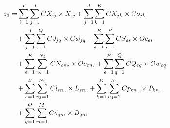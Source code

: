 \documentclass[preprint,12pt,authoryear]{elsarticle}
\begin{document}
\begin{align}
  z_3 &= \sum_{i=1}^I\sum_{j=1}^J CX_{ij} \times X_{ij} 
      + \sum_{j=1}^J\sum_{k=1}^K CK_{jk} \times Go_{jk} \notag \\
      &\quad + \sum_{j=1}^J\sum_{q=1}^Q CJ_{jq} \times Gw_{jq}
      + \sum_{e=1}^E\sum_{s=1}^S CS_{es} \times Oc_{es} \notag \\
      &\quad + \sum_{e=1}^E\sum_{n_2=1}^{N_2} CN_{en_2} \times Oc_{en_2}
      + \sum_{e=1}^E\sum_{q=1}^Q CQ_{eq} \times Ow_{eq} \notag \\
      &\quad + \sum_{s=1}^S\sum_{n_3=1}^{N_3} Cl_{sn_3} \times L_{sn_3}
      + \sum_{k=1}^K\sum_{n_1=1}^{N_1} Cp_{kn_1} \times P_{kn_1} \notag \\
      &\quad + \sum_{q=1}^Q\sum_{m=1}^M Cd_{qm} \times D_{qm}
      \label{eq:custo3}
\end{align}
\end{document}
